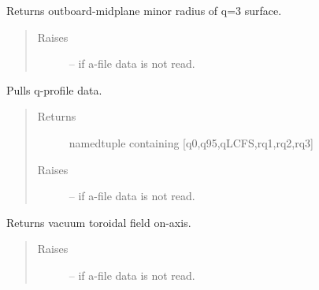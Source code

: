 \documentclass[letterpaper,10pt,english]{sphinxmanual}
\begin{document}
\begin{fulllineitems}
\begin{fulllineitems}
\begin{quote}
\begin{description}
\end{description}\end{quote}

\end{fulllineitems}


\begin{fulllineitems}
\label{eqtools:eqtools.eqdskreader.EqdskReader.getQ3Surf}
Returns outboard-midplane minor radius of q=3 surface.
\begin{quote}\begin{description}
\item[{Raises }] \leavevmode
{} -- 
if a-file data is not read.

\end{description}\end{quote}

\end{fulllineitems}


\begin{fulllineitems}
\label{eqtools:eqtools.eqdskreader.EqdskReader.getQs}
Pulls q-profile data.
\begin{quote}\begin{description}
\item[{Returns}] \leavevmode
namedtuple containing {[}q0,q95,qLCFS,rq1,rq2,rq3{]}

\item[{Raises }] \leavevmode
{} -- 
if a-file data is not read.

\end{description}\end{quote}

\end{fulllineitems}


\begin{fulllineitems}
\label{eqtools:eqtools.eqdskreader.EqdskReader.getBtVac}
Returns vacuum toroidal field on-axis.
\begin{quote}\begin{description}
\item[{Raises }] \leavevmode
{} -- 
if a-file data is not read.


\end{description}
\end{quote}
\end{fulllineitems}
\end{fulllineitems}
\end{document}
